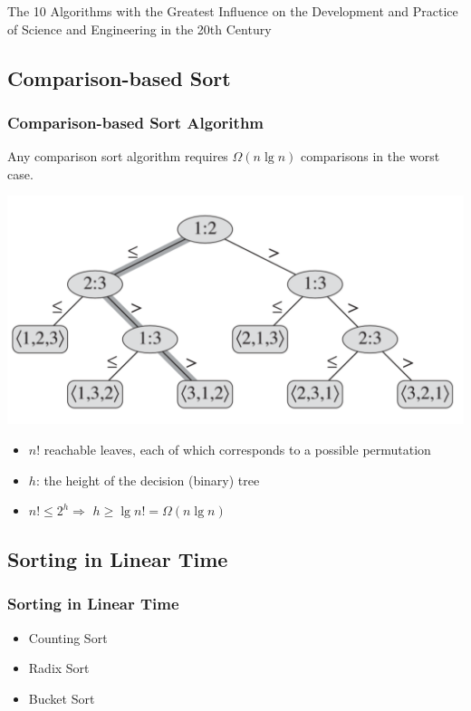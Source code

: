 \documentclass[UTF8,11pt,handout]{beamer}
\begin{document}
\begin{frame}[t]
\begin{block}{The 10 Algorithms with the Greatest Influence on the Development and Practice of Science and Engineering in the 20th Century}
\end{block}
\end{frame}
\subsection{Comparison-based Sort}
\begin{frame}
	\frametitle{Comparison-based Sort Algorithm}
	\begin{theorem}[8.1]{
		Any comparison sort algorithm requires \textbf{\color{blue}$\Omega(n\lg{n})$} comparisons in the worst case.
			
	}
	\end{theorem}
	\begin{center}
	\includegraphics[width=.6\textwidth]{figs/decision_tree_comparison_based_sorting.png}
	\begin{itemize}
		\item \textbf{\color{blue}$n!$} reachable leaves, each of which corresponds to a possible permutation
		\item \textbf{\color{blue}$h$}:  the height of the decision (binary) tree
		\item $n!\le 2^h \Longrightarrow$ {\color{blue}$h\ge \lg{n!}=\Omega(n\lg{n})$}
	\end{itemize}
	\end{center}
\end{frame}

\subsection{Sorting in Linear Time}
\begin{frame}
\frametitle{Sorting in Linear Time}
\begin{itemize}
	\item Counting Sort
	\item Radix Sort
	\item Bucket Sort
\end{itemize}
\end{frame}
\end{document}
